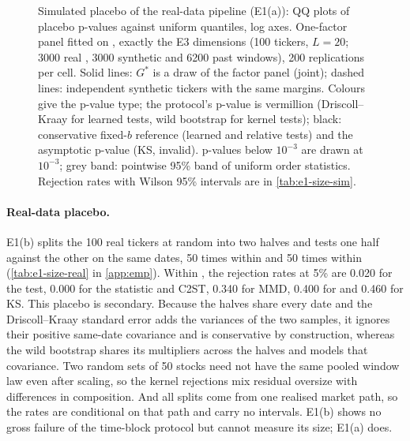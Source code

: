 \begin{figure}[tbp]
  \centering
  \caption{Simulated placebo of the real-data pipeline (E1(a)): QQ plots of placebo p-values
    against uniform quantiles, log axes. One-factor \GARCHt{} panel fitted on \TRAIN{}, exactly
    the E3 dimensions (100 tickers, $L=20$; 3000 real \TEST{}, 3000 synthetic and 6200 past
    windows), 200 replications per cell. Solid lines: $G^*$ is a draw of the factor panel
    (joint); dashed lines: independent synthetic tickers with the same margins. Colours give the
    p-value type; the protocol's p-value is vermillion (Driscoll--Kraay for learned tests, wild
    bootstrap for kernel tests); black: conservative fixed-$b$ reference (learned and relative tests) and the
    asymptotic \iid{} p-value (KS, invalid). p-values below $10^{-3}$ are drawn at $10^{-3}$; grey band:
    pointwise 95\% band of uniform order statistics. Rejection rates with Wilson 95\% intervals
    are in \cref{tab:e1-size-sim}.}
  \label{fig:e1-pvalue-qq}
\end{figure}

\paragraph{Real-data placebo.}
E1(b) splits the 100 real tickers at random into two halves and tests one half against the
other on the same dates, 50 times within \TEST{} and 50 times within \TRAIN{}
(\cref{tab:e1-size-real} in \cref{app:emp}). Within \TEST{}, the rejection rates at 5\% are
0.020 for the \WC{} test, 0.000 for the \LRC{} statistic and C2ST, 0.340 for MMD, 0.400 for
\SigMMD{} and 0.460 for KS. This placebo is secondary. Because the halves share every date and
the Driscoll--Kraay standard error adds the variances of the two samples, it ignores their
positive same-date covariance and is conservative by construction, whereas the wild bootstrap
shares its multipliers across the halves and models that covariance. Two random sets of 50
stocks need not have the same pooled window law even after scaling, so the kernel rejections mix
residual oversize with differences in composition. And all splits come from one realised market
path, so the rates are conditional on that path and carry no intervals. E1(b) shows no gross
failure of the time-block protocol but cannot measure its size; E1(a) does.

